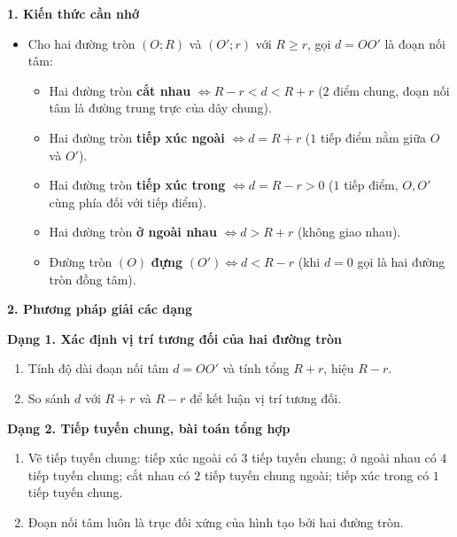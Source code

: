 \textbf{1. Kiến thức cần nhớ}
\begin{itemize}
\item Cho hai đường tròn $(O; R)$ và $(O'; r)$ với $R \ge r$, gọi $d = OO'$ là đoạn nối tâm:
\begin{itemize}
\item Hai đường tròn \textbf{cắt nhau} $\iff \boxed{R - r < d < R + r}$ ($2$ điểm chung, đoạn nối tâm là đường trung trực của dây chung).
\item Hai đường tròn \textbf{tiếp xúc ngoài} $\iff \boxed{d = R + r}$ ($1$ tiếp điểm nằm giữa $O$ và $O'$).
\item Hai đường tròn \textbf{tiếp xúc trong} $\iff \boxed{d = R - r > 0}$ ($1$ tiếp điểm, $O, O'$ cùng phía đối với tiếp điểm).
\item Hai đường tròn \textbf{ở ngoài nhau} $\iff \boxed{d > R + r}$ (không giao nhau).
\item Đường tròn $(O)$ \textbf{đựng} $(O') \iff \boxed{d < R - r}$ (khi $d = 0$ gọi là hai đường tròn đồng tâm).
\end{itemize}
\end{itemize}

\textbf{2. Phương pháp giải các dạng}

\textbf{Dạng 1. Xác định vị trí tương đối của hai đường tròn}
\begin{enumerate}
\item Tính độ dài đoạn nối tâm $d = OO'$ và tính tổng $R + r$, hiệu $R - r$.
\item So sánh $d$ với $R + r$ và $R - r$ để kết luận vị trí tương đối.
\end{enumerate}

\textbf{Dạng 2. Tiếp tuyến chung, bài toán tổng hợp}
\begin{enumerate}
\item Vẽ tiếp tuyến chung: tiếp xúc ngoài có $3$ tiếp tuyến chung; ở ngoài nhau có $4$ tiếp tuyến chung; cắt nhau có $2$ tiếp tuyến chung ngoài; tiếp xúc trong có $1$ tiếp tuyến chung.
\item Đoạn nối tâm luôn là trục đối xứng của hình tạo bởi hai đường tròn.
\end{enumerate}
